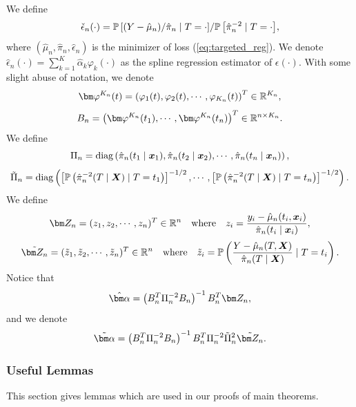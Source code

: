 We define 
$$\check\epsilon_n(\cdot) = {\P\left[(Y-\hat\mu_n)/\hat\pi_n\mid T=\cdot\right]}/{\P\left[\hat\pi_n^{-2}\mid T=\cdot\right]},
$$ 
where $(\hat\mu_n,\hat\pi_n,\hat\epsilon_n)$ is the minimizer of loss (\ref{eq:targeted_reg}). We denote $\hat \epsilon_n(\cdot)=\sum_{k=1}^{K}\hat \alpha_k\varphi_k(\cdot)$ as the spline regression estimator of $\epsilon(\cdot)$. With some slight abuse of notation, we denote
$$\vpk(t)=\left(\varphi_1(t),\varphi_2(t),\cdots,\varphi_{K_n}(t)\right)^T\in\R^{K_n},$$ $$B_n=\left(\vpk(t_1),\cdots,\vpk(t_n)\right)^T\in\R^{n\times K_n}.$$ 
We define
$$\Pi_n=\text{diag}\left(\hat\pi_n(t_1\mid\x_1), \hat\pi_n(t_2\mid\x_2), \cdots, \hat\pi_n(t_n\mid\x_n)\right),$$
$$\tilde\Pi_n=\text{diag}\left(
\left[\P\left(\hat\pi_n^{-2}(T\mid\X)\mid T=t_1\right)\right]^{-1/2}, \cdots, 
\left[\P\left(\hat\pi_n^{-2}(T\mid\X)\mid T=t_n\right)\right]^{-1/2}\right).$$
We define
$$\Zn=(z_1,z_2,\cdots,z_n)^T\in\R^n\quad\text{where}\quad z_i=\frac{y_i-\hat \mu_n(t_i,\x_i)}{\hat\pi_n(t_i\mid\x_i)},$$
$$\tilde\Zn=(\tilde z_1,\tilde z_2,\cdots,\tilde z_n)^T\in\R^n\quad\text{where}\quad\tilde z_i=\P\left(\frac{Y-\hat \mu_n(T,\X)}{\hat\pi_n(T\mid\X)}\mid T=t_i\right).$$ 
Notice that
$$\hat{\bm\alpha}=\left(B_n^T\Pi_n^{-2}B_n\right)^{-1}B_n^T\Zn,$$
and we denote
$$\tilde{\bm\alpha}=\left(B_n^T\Pi_n^{-2}B_n\right)^{-1}B_n^T\Pi_n^{-2}\tilde\Pi_n^2\tilde\Zn.$$


\subsubsection{Useful Lemmas}
This section gives lemmas which are used in our proofs of main theorems. 

